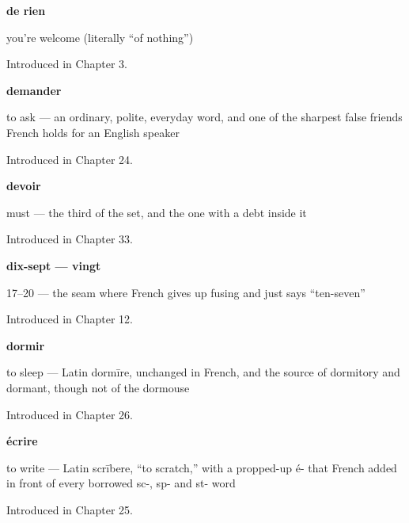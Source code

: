\noindent\begin{minipage}[t]{\linewidth}
\raggedright
\textbf{de rien}\par
\small you're welcome (literally \textquotedblleft{}of nothing\textquotedblright{})\par
\footnotesize Introduced in Chapter 3.
\end{minipage}\par\medskip

\noindent\begin{minipage}[t]{\linewidth}
\raggedright
\textbf{demander}\par
\small to ask — an ordinary, polite, everyday word, and one of the sharpest false friends French holds for an English speaker\par
\footnotesize Introduced in Chapter 24.
\end{minipage}\par\medskip

\noindent\begin{minipage}[t]{\linewidth}
\raggedright
\textbf{devoir}\par
\small must — the third of the set, and the one with a debt inside it\par
\footnotesize Introduced in Chapter 33.
\end{minipage}\par\medskip

\noindent\begin{minipage}[t]{\linewidth}
\raggedright
\textbf{dix-sept — vingt}\par
\small 17–20 — the seam where French gives up fusing and just says \textquotedblleft{}ten-seven\textquotedblright{}\par
\footnotesize Introduced in Chapter 12.
\end{minipage}\par\medskip

\noindent\begin{minipage}[t]{\linewidth}
\raggedright
\textbf{dormir}\par
\small to sleep — Latin dormīre, unchanged in French, and the source of dormitory and dormant, though not of the dormouse\par
\footnotesize Introduced in Chapter 26.
\end{minipage}\par\medskip

\noindent\begin{minipage}[t]{\linewidth}
\raggedright
\textbf{écrire}\par
\small to write — Latin scrībere, \textquotedblleft{}to scratch,\textquotedblright{} with a propped-up é- that French added in front of every borrowed sc-, sp- and st- word\par
\footnotesize Introduced in Chapter 25.
\end{minipage}\par\medskip

